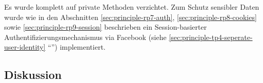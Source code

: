 Es wurde komplett auf private Methoden verzichtet. Zum Schutz sensibler Daten wurde wie in den Abschnitten \ref{sec:principle-rp7-auth}, \ref{sec:principle-rp8-cookies} sowie \ref{sec:principle-rp9-session} beschrieben ein Session-basierter Authentifizierungsmechanismus via Facebook (siehe \ref{sec:principle-tp4-seperate-user-identity} ``'') implementiert.


\subsection*{Diskussion}
